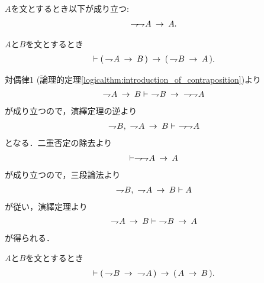 	\begin{screen}
		\begin{logicalaxm}[二重否定の除去]
		\label{logicalaxm:elimination_of_double_negation}
			$A$を文とするとき以下が成り立つ:
			\begin{align}
				\negation \negation A \rarrow A.
			\end{align}
		\end{logicalaxm}
	\end{screen}
	
	\begin{screen}
		\begin{logicalthm}[対偶律3]\label{logicalthm:contraposition_3}
			$A$と$B$を文とするとき
			\begin{align}
				\vdash (\, \negation A \rarrow B\, )
				\rarrow (\, \negation B \rarrow A\, ).
			\end{align}
		\end{logicalthm}
	\end{screen}
	
	\begin{sketch}
		対偶律1 (論理的定理\ref{logicalthm:introduction_of_contraposition})より
		\begin{align}
			\negation A \rarrow B \vdash\ \negation B \rarrow\ \negation \negation A
		\end{align}
		が成り立つので，演繹定理の逆より
		\begin{align}
			\negation B,\ \negation A \rarrow B \vdash\ \negation \negation A
		\end{align}
		となる．二重否定の除去より
		\begin{align}
			\vdash \negation \negation A \rarrow A
		\end{align}
		が成り立つので，三段論法より
		\begin{align}
			\negation B,\ \negation A \rarrow B \vdash A
		\end{align}
		が従い，演繹定理より
		\begin{align}
			\negation A \rarrow B \vdash\ \negation B \rarrow A
		\end{align}
		が得られる．
		\QED
	\end{sketch}
	
	\begin{screen}
		\begin{logicalthm}[対偶律4]
		\label{logicalthm:proof_by_contraposition}
			$A$と$B$を文とするとき
			\begin{align}
				\vdash (\, \negation B \rarrow\ \negation A\, )
				\rarrow (\, A \rarrow B\, ).
			\end{align}
		\end{logicalthm}
	\end{screen}
	
